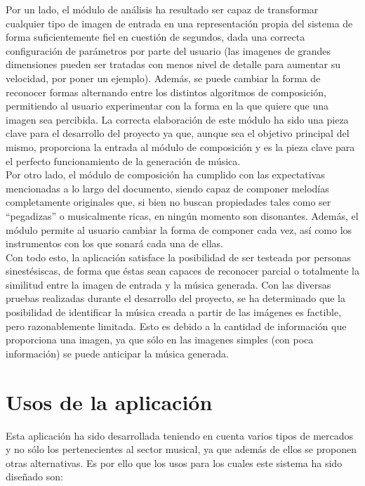 Por un lado, el módulo de análisis ha resultado ser capaz de transformar cualquier tipo de imagen de entrada en una representación propia del sistema de forma suficientemente fiel en cuestión de segundos, dada una correcta configuración de parámetros por parte del usuario (las imagenes de grandes dimensiones pueden ser tratadas con menos nivel de detalle para aumentar su velocidad, por poner un ejemplo). Además, se puede cambiar la forma de reconocer formas alternando entre los distintos algoritmos de composición, permitiendo al usuario experimentar con la forma en la que quiere que una imagen sea percibida. La correcta elaboración de este módulo ha sido una pieza clave para el desarrollo del proyecto ya que, aunque sea el objetivo principal del mismo, proporciona la entrada al módulo de composición y es la pieza clave para el perfecto funcionamiento de la generación de música.\\

Por otro lado, el módulo de composición ha cumplido con las expectativas mencionadas a lo largo del documento, siendo capaz de componer melodías completamente originales que, si bien no buscan propiedades tales como ser ``pegadizas'' o musicalmente ricas, en ningún momento son disonantes. Además, el módulo permite al usuario cambiar la forma de componer cada vez, así como los instrumentos con los que sonará cada una de ellas.\\

Con todo esto, la aplicación satisface la posibilidad de ser testeada por personas sinestésiscas, de forma que éstas sean capaces de reconocer parcial o totalmente la similitud entre la imagen de entrada y la música generada. Con las diversas pruebas realizadas durante el desarrollo del proyecto, se ha determinado que la posibilidad de identificar la música creada a partir de las imágenes es factible, pero razonablemente limitada. Esto es debido a la cantidad de información que proporciona una imagen, ya que sólo en las imagenes simples (con poca información) se puede anticipar la música generada.\\


\section{Usos de la aplicación}
\label{sec:usos}

Esta aplicación ha sido desarrollada teniendo en cuenta varios tipos de mercados y no sólo los pertenecientes al sector musical, ya que además de ellos se proponen otras alternativas. Es por ello que los usos para los cuales este sistema ha sido diseñado son:

